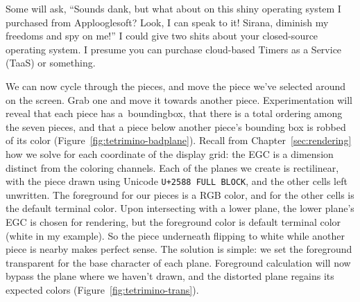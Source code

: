 Some will ask, ``Sounds dank, but what about on this shiny operating system I
purchased from Applooglesoft? Look, I can speak to it! Sirana, diminish my
freedoms and spy on me!'' I could give two shits about your closed-source
operating system. I presume you can purchase cloud-based Timers as a Service
(TaaS) or something.

We can now cycle through the pieces, and move the piece we've selected around
on the screen. Grab one and move it towards another piece. Experimentation will
reveal that each piece has a~\gls{boundingbox}, that there is a total ordering
among the seven pieces, and that a piece below another piece's bounding box is
robbed of its color (Figure~\ref{fig:tetrimino-badplane}). Recall from
Chapter~\ref{sec:rendering} how we solve for each coordinate of the display
grid: the EGC is a dimension distinct from the coloring channels. Each of the
planes we create is rectilinear, with the piece drawn using Unicode
\texttt{U+2588 FULL BLOCK}, and the other cells left unwritten. The foreground
for our pieces is a RGB color, and for the other cells is the default terminal
color. Upon intersecting with a lower plane, the lower plane's EGC is chosen for
rendering, but the foreground color is default terminal color (white in my
example). So the piece underneath flipping to white while another piece is
nearby makes perfect sense. The solution is simple: we set the foreground
transparent for the base character of each plane. Foreground calculation will
now bypass the plane where we haven't drawn, and the distorted plane regains
its expected colors (Figure~\ref{fig:tetrimino-trans}).

